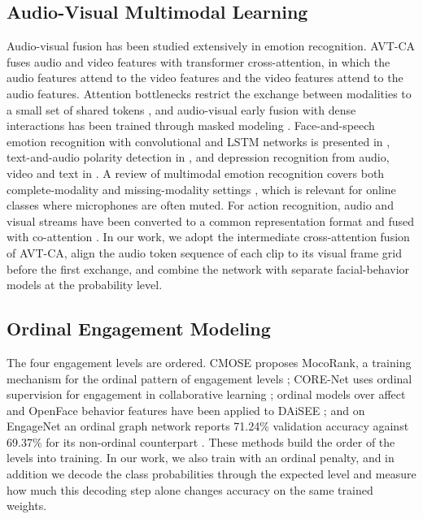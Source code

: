 \documentclass[journal]{IEEEtran}
\begin{document}
\subsection{Audio-Visual Multimodal Learning}

Audio-visual fusion has been studied extensively in emotion recognition. AVT-CA \cite{venkatraman2025avtca} fuses audio and video features with transformer cross-attention, in which the audio features attend to the video features and the video features attend to the audio features. Attention bottlenecks restrict the exchange between modalities to a small set of shared tokens \cite{nagrani2021attention}, and audio-visual early fusion with dense interactions has been trained through masked modeling \cite{mo2024earlyfusion}. Face-and-speech emotion recognition with convolutional and LSTM networks is presented in \cite{taware2025mer}, text-and-audio polarity detection in \cite{hegde2025sentiment}, and depression recognition from audio, video and text in \cite{lu2026dstc}. A review of multimodal emotion recognition covers both complete-modality and missing-modality settings \cite{li2026mersurvey}, which is relevant for online classes where microphones are often muted. For action recognition, audio and visual streams have been converted to a common representation format and fused with co-attention \cite{kim2024avaction}. In our work, we adopt the intermediate cross-attention fusion of AVT-CA, align the audio token sequence of each clip to its visual frame grid before the first exchange, and combine the network with separate facial-behavior models at the probability level.

\subsection{Ordinal Engagement Modeling}

The four engagement levels are ordered. CMOSE proposes MocoRank, a training mechanism for the ordinal pattern of engagement levels \cite{wu2024cmose}; CORE-Net uses ordinal supervision for engagement in collaborative learning \cite{tran2026ordinal}; ordinal models over affect and OpenFace behavior features have been applied to DAiSEE \cite{abedi2024affect,safa2025sclordinal}; and on EngageNet an ordinal graph network reports 71.24\% validation accuracy against 69.37\% for its non-ordinal counterpart \cite{abedi2024stgcn}. These methods build the order of the levels into training. In our work, we also train with an ordinal penalty, and in addition we decode the class probabilities through the expected level and measure how much this decoding step alone changes accuracy on the same trained weights.
\end{document}
